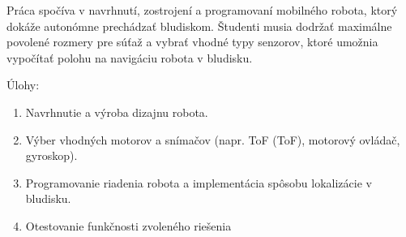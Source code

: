 
Práca spočíva v navrhnutí, zostrojení a programovaní mobilného robota, ktorý dokáže autonómne prechádzať bludiskom.
Študenti musia dodržať maximálne povolené rozmery pre súťaž a vybrať vhodné typy senzorov, ktoré umožnia vypočítať
polohu na navigáciu robota v bludisku.

Úlohy:
\begin{enumerate}
	\item Navrhnutie a výroba dizajnu robota.
	\item Výber vhodných motorov a snímačov (napr. ToF (\acrlong{ToF}), motorový ovládač, gyroskop).
	\item Programovanie riadenia robota a implementácia spôsobu lokalizácie v bludisku.
	\item Otestovanie funkčnosti zvoleného riešenia
\end{enumerate}

